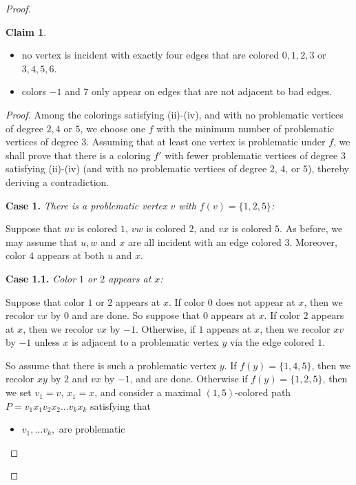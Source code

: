 \documentclass[12pt]{article}
\theoremstyle{plain}
\theoremstyle{definition}
\newtheorem{claim}[theorem]{Claim}
\numberwithin{equation}{section}
\begin{document}
\begin{proof}
\begin{claim}
\begin{itemize}
	\item[(iii)] no vertex is incident with exactly four edges that are colored $0,1,2,3$ or $3,4,5,6$.

	\item[(iv)] colors $-1$ and $7$ only  appear on edges that are not adjacent to bad edges.
\end{itemize}
\end{claim}
\begin{proof}
	Among the colorings satisfying (ii)-(iv), and with no problematic vertices of degree
	$2,4$ or $5$,
	we choose one $f$ with the minimum number
	of problematic vertices of degree $3$. Assuming that at least one vertex is problematic under $f$,
	we shall prove that there is a coloring $f'$ with fewer problematic vertices of degree $3$ 
	satisfying (ii)-(iv) (and with no problematic vertices of degree $2$, $4$, or $5$), 
	thereby deriving a contradiction.

	
	\bigskip

	{\bf Case 1.}	 {\em There is a problematic vertex $v$ with $f(v) =\{1,2, 5\}$:}

	Suppose that $uv$ is colored $1$, $vw$ is colored $2$, and $vx$ is colored $5$. As before,
	we may assume that $u,w$ and $x$ are all incident with an edge colored $3$. Moreover, color $4$
	appears at both $u$ and $x$.

	\bigskip

	{\bf Case 1.1.} {\em Color $1$ or $2$ appears at $x$:}

	Suppose that color $1$ or $2$ appears at $x$. If color $0$ does not appear at $x$, then we recolor
	$vx$ by $0$ and are done. So suppose that $0$ appears at $x$. If color $2$ appears at $x$, then
	we recolor $vx$ by $-1$. Otherwise, if $1$ appears at $x$, then we recolor $xv$ by $-1$ unless
	$x$ is adjacent to a problematic vertex $y$ via the edge colored $1$.
	
	So assume that there is such a problematic vertex $y$.
	If $f(y) = \{1,4,5\}$, then we recolor $xy$ by $2$ and $vx$ by $-1$, and are done.
	Otherwise if $f(y) = \{1,2,5\}$, then we set $v_1 = v$, $x_1 = x$, and consider a maximal
	$(1,5)$-colored path $P = v_1 x_1 v_2 x_2 \dots v_k x_k$ satisfying that
\begin{itemize}

	\item $v_1, \dots v_k,$ are problematic


\end{itemize}
\end{proof}
\end{proof}
\end{document}
